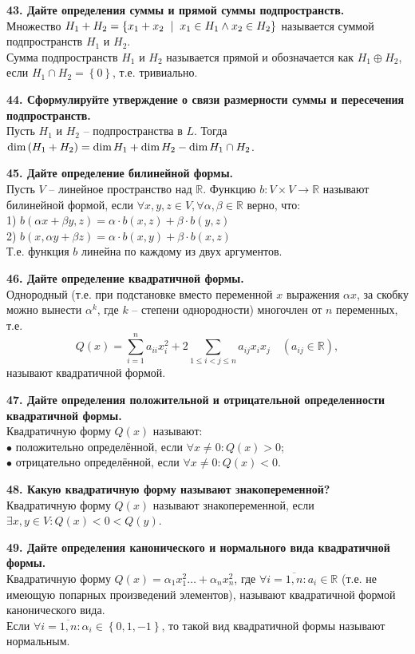 \documentclass[11pt,a4paper]{article}
\newcommand{\R}{\mathbb{R}}
\newcommand{\Dim}[1]{\mathrm{dim}\hspace{0.5mm}#1}
\renewcommand{\mid}{\hspace{2mm}\middle|\hspace{2mm}}
\begin{document}
\textbf{43. Дайте определения суммы и прямой суммы подпространств.\\}
Множество $H_1 + H_2 = \left\{ x_1 + x_2 \mid x_1 \in H_1 \wedge x_2 \in H_2 \right\}$ называется суммой подпространств $H_1$ и $H_2$.\\
Сумма подпространств $H_1$ и $H_2$ называется прямой и обозначается как $H_1 \oplus H_2$, если $H_1 \cap H_2 = \left\{ 0 \right\}$, т.е. тривиально.

\textbf{44. Сформулируйте утверждение о связи размерности суммы и пересечения подпространств.\\}
Пусть $H_1$ и $H_2$ -- подпространства в $L$. Тогда $\Dim{(H_1 + H_2)} = \Dim{H_1} + \Dim{H_2} - \Dim{H_1 \cap H_2}$.

\textbf{45. Дайте определение билинейной формы.\\}
Пусть $V$ -- линейное пространство над $\R$. Функцию $b: V \times V \rightarrow \R$ называют билинейной формой, если $\forall x, y, z \in V, \forall \alpha, \beta \in \R$ верно, что:\\
1) $b(\alpha x + \beta y, z) = \alpha \cdot b(x, z) + \beta \cdot b(y, z)$\\
2) $b(x, \alpha y + \beta z) = \alpha \cdot b(x, y) + \beta \cdot b(x, z)$\\
Т.е. функция $b$ линейна по каждому из двух аргументов.

\textbf{46. Дайте определение квадратичной формы.\\}
Однородный (т.е. при подстановке вместо переменной $x$ выражения $\alpha x$, за скобку можно вынести $\alpha^k$, где $k$ -- степени однородности) многочлен от $n$ переменных, т.е. $$Q(x) = \sum_{i = 1}^n a_{ii} x_i^2 + 2 \sum_{1 \leq i < j \leq n} a_{ij} x_i x_j \quad (a_{ij} \in \R),$$ называют квадратичной формой.
\pagebreak

\textbf{47. Дайте определения положительной и отрицательной определенности квадратичной формы.\\}
Квадратичную форму $Q(x)$ называют:\\
$\bullet$ положительно определённой, если $\forall x \neq 0: Q(x) > 0$;\\
$\bullet$ отрицательно определённой, если $\forall x \neq 0: Q(x) < 0$.

\textbf{48. Какую квадратичную форму называют знакопеременной?\\}
Квадратичную форму $Q(x)$ называют знакопеременной, если $\exists x, y \in V: Q(x) < 0 < Q(y)$.

\textbf{49. Дайте определения канонического и нормального вида квадратичной формы.\\}
Квадратичную форму $Q(x) = \alpha_1 x_1^2 \hdots + \alpha_n x_n^2$, где $\forall i = \overline{1, n}: a_i \in \R$ (т.е. не имеющую попарных произведений элементов), называют квадратичной формой канонического вида.\\
Если $\forall i = \overline{1, n}: \alpha_i \in \left\{ 0, 1, -1 \right\}$, то такой вид квадратичной формы называют нормальным.
\end{document}
